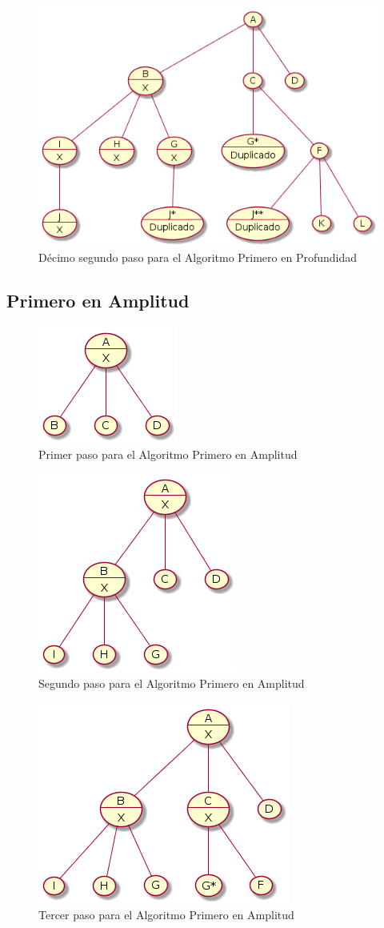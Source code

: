\documentclass{article}
\begin{document}
\begin{figure}[H]
  \centering
  \includegraphics[width=.4\linewidth]{EJ3/profundidad_011.png}
  \caption{D\'ecimo segundo paso para el Algoritmo Primero en Profundidad}
  \label{gr:g13}
\end{figure}

\subsection{Primero en Amplitud}

\begin{figure}[H]
  \centering
  \includegraphics[width=.4\linewidth]{EJ4/ej4.png}
  \caption{Primer paso para el Algoritmo Primero en Amplitud}
  \label{gr:g14}
\end{figure}

\begin{figure}[H]
  \centering
  \includegraphics[width=.4\linewidth]{EJ4/ej4_001.png}
  \caption{Segundo paso para el Algoritmo Primero en Amplitud}
  \label{gr:g15}
\end{figure}

\begin{figure}[H]
  \centering
  \includegraphics[width=.4\linewidth]{EJ4/ej4_002.png}
  \caption{Tercer paso para el Algoritmo Primero en Amplitud}
  \label{gr:g16}
\end{figure}
\end{document}
